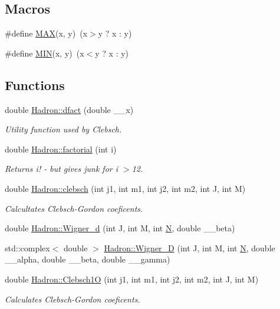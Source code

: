 \subsection*{Macros}
\begin{DoxyCompactItemize}
\item 
\#define \mbox{\hyperlink{adat-devel_2lib_2hadron_2clebsch_8cc_aacc3ee1a7f283f8ef65cea31f4436a95}{M\+AX}}(x,  y)~(x$>$y ? x \+: y)
\item 
\#define \mbox{\hyperlink{adat-devel_2lib_2hadron_2clebsch_8cc_a74e75242132eaabbc1c512488a135926}{M\+IN}}(x,  y)~(x$<$y ? x \+: y)
\end{DoxyCompactItemize}
\subsection*{Functions}
\begin{DoxyCompactItemize}
\item 
double \mbox{\hyperlink{namespaceHadron_a5851b4dcb78567e53c44241a6db6c87e}{Hadron\+::dfact}} (double \+\_\+\+\_\+x)
\begin{DoxyCompactList}\small\item\em Utility function used by Clebsch. \end{DoxyCompactList}\item 
double \mbox{\hyperlink{namespaceHadron_a0df3fb454ec05867e44777d4f5a6b7f7}{Hadron\+::factorial}} (int i)
\begin{DoxyCompactList}\small\item\em Returns i! -\/ but gives junk for i $>$12. \end{DoxyCompactList}\item 
double \mbox{\hyperlink{namespaceHadron_ac4cba1d4aa3863fdc7991c208b3b9594}{Hadron\+::clebsch}} (int j1, int m1, int j2, int m2, int J, int M)
\begin{DoxyCompactList}\small\item\em Calcultates Clebsch-\/\+Gordon coeficents. \end{DoxyCompactList}\item 
double \mbox{\hyperlink{namespaceHadron_a63c49af65c1d943a78205d3b8b63079a}{Hadron\+::\+Wigner\+\_\+d}} (int J, int M, int \mbox{\hyperlink{adat__devel_2lib_2hadron_2operator__name__util_8cc_a7722c8ecbb62d99aee7ce68b1752f337}{N}}, double \+\_\+\+\_\+beta)
\item 
std\+::complex$<$ double $>$ \mbox{\hyperlink{namespaceHadron_a4d99a17c00bdddfc88a14c0571b74338}{Hadron\+::\+Wigner\+\_\+D}} (int J, int M, int \mbox{\hyperlink{adat__devel_2lib_2hadron_2operator__name__util_8cc_a7722c8ecbb62d99aee7ce68b1752f337}{N}}, double \+\_\+\+\_\+alpha, double \+\_\+\+\_\+beta, double \+\_\+\+\_\+gamma)
\item 
double \mbox{\hyperlink{namespaceHadron_a78e0e843ad34636504d3ab3f2280e5e5}{Hadron\+::\+Clebsch1O}} (int j1, int m1, int j2, int m2, int J, int M)
\begin{DoxyCompactList}\small\item\em Calculates Clebsch-\/\+Gordon coeficents. \end{DoxyCompactList}\end{DoxyCompactItemize}


